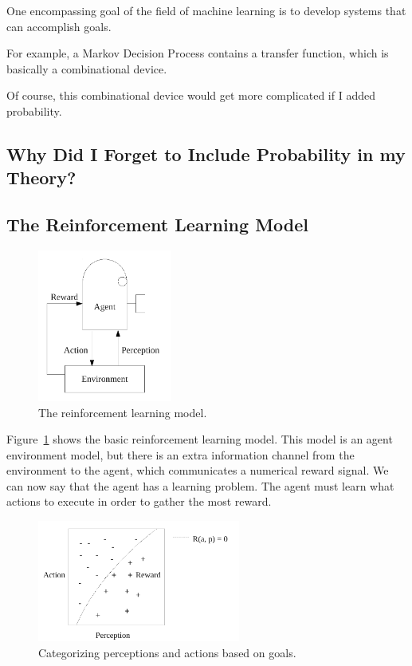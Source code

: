 One encompassing goal of the field of machine learning is to develop
systems that can accomplish goals.

For example, a Markov Decision Process contains a transfer function,
which is basically a combinational device.

Of course, this combinational device would get more complicated if I added probability.



\subsection{Why Did I Forget to Include Probability in my Theory?}



\subsection{The Reinforcement Learning Model}

\begin{figure}[bth]
  \center
  \includegraphics[height=5cm]{gfx/reinforcement_learning}
  \caption[The reinforcement learning model]{The reinforcement learning model.}
  \label{fig:reinforcement_learning}
\end{figure}

Figure~\ref{fig:reinforcement_learning} shows the basic reinforcement
learning model.  This model is an agent environment model, but there
is an extra information channel from the environment to the agent,
which communicates a numerical reward signal.  We can now say that the
agent has a learning problem.  The agent must learn what actions to
execute in order to gather the most reward.

\begin{figure}[bth]
  \center
  \includegraphics[height=4cm]{gfx/perception_categorization}
  \caption[Categorizing perceptions and actions based on goals]{Categorizing perceptions and actions based on goals.}
  \label{fig:perception_categorization}
\end{figure}

